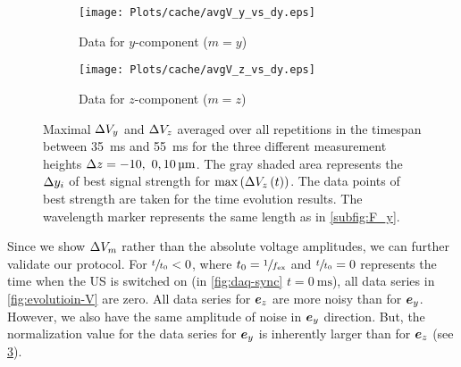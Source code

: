 \begin{figure}[ht]
  \centering
  \begin{subfigure}{\figWidth}
    \centering
    \caption{Data for $y$-component ($m = y$)}\label{subfig:res_DV_y}
    \texttt{[image: Plots/cache/avgV\_y\_vs\_dy.eps]}
  \end{subfigure}%
  \begin{subfigure}{\figWidth}
    \centering
    \caption{Data for $z$-component ($m = z$)}\label{subfig:res_DV_z}
    \texttt{[image: Plots/cache/avgV\_z\_vs\_dy.eps]}
  \end{subfigure}%
  \caption{Maximal $\Delta V_{y}$ and $\Delta V_{z}$ averaged over all repetitions in the 
    timespan between \SI{35}{\ms} and \SI{55}{\ms} for the three different 
    measurement heights $\Dz = \SIlist[list-units=single, list-final-separator 
    = {, }, list-pair-separator= {, }] {-10;0;10}{\um}$. The gray shaded area 
    represents the $\Delta y_{i}$ of best signal strength for $\max\left( 
    \Delta V_{z}\left( t \right) \right)$. The data points of best strength are 
    taken for the time evolution results. The wavelength marker represents the 
  same length as in \cref{subfig:F_y}.}\label{fig:DV_vs_dy}
\end{figure}%

Since we show $\Delta V_{m}$ rather than the absolute voltage amplitudes, we can 
further validate our protocol. For $\sfrac{t}{t_{0}} < 0$, where $t_{0} = 
\sfrac{1}{f_{\text{ex}}}$ and $\sfrac{t}{t_{0}}=0$ represents the time when the US is 
switched on (in \cref{fig:daq-sync} $t = \SI{0}{\ms}$), all data series in 
\cref{fig:evolutioin-V} are zero. All data series for $\bm{e}_{z}$ are more noisy than 
for $\bm{e}_{y}$. However, we also have the same amplitude of noise in $\bm{e}_{y}$ 
direction. But, the normalization value for the data series for $\bm{e}_{y}$ is 
inherently larger than for $\bm{e}_{z}$ (see \cref{fig:DV_vs_dy}).


